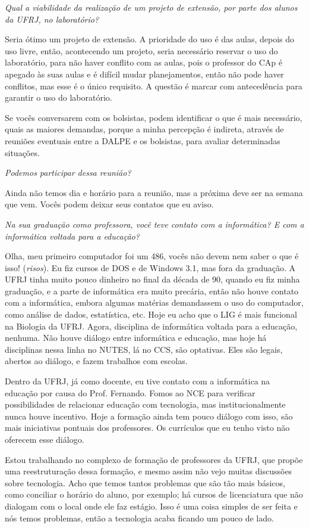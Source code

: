 \textit{Qual a viabilidade da realização de um projeto de extensão, por parte dos alunos da UFRJ, no laboratório?}

Seria ótimo um projeto de extensão. A prioridade do uso é das aulas, depois do uso livre, então, acontecendo um projeto, seria necessário reservar o uso do laboratório, para não haver conflito com as aulas, pois o professor do CAp é apegado às suas aulas e é difícil mudar planejamentos, então não pode haver conflitos, mas esse é o único requisito. A questão é marcar com antecedência para garantir o uso do laboratório.

Se vocês conversarem com os bolsistas, podem identificar o que é mais necessário, quais as maiores demandas, porque a minha percepção é indireta, através de reuniões eventuais entre a DALPE e os bolsistas, para avaliar determinadas situações.

\textit{Podemos participar dessa reunião?}

Ainda não temos dia e horário para a reunião, mas a próxima deve ser na semana que vem. Vocês podem deixar seus contatos que eu aviso.

\textit{Na sua graduação como professora, você teve contato com a informática? E com a informática voltada para a educação?}

Olha, meu primeiro computador foi um 486, vocês não devem nem saber o que é isso! (\textit{risos}). Eu fiz cursos de DOS e de Windows 3.1, mas fora da graduação. A UFRJ tinha muito pouco dinheiro no final da década de 90, quando eu fiz minha graduação, e a parte de informática era muito precária, então não houve contato com a informática, embora algumas matérias demandassem o uso do computador, como análise de dados, estatística, etc. Hoje eu acho que o LIG é mais funcional na Biologia da UFRJ. Agora, disciplina de informática voltada para a educação, nenhuma. Não houve diálogo entre informática e educação, mas hoje há disciplinas nessa linha no NUTES, lá no CCS, são optativas. Eles são legais, abertos ao diálogo, e fazem trabalhos com escolas.

Dentro da UFRJ, já como docente, eu tive contato com a informática na educação por causa do Prof. Fernando. Fomos ao NCE para verificar possibilidades de relacionar educação com tecnologia, mas institucionalmente nunca houve incentivo. Hoje a formação ainda tem pouco diálogo com isso, são mais iniciativas pontuais dos professores. Os currículos que eu tenho visto não oferecem esse diálogo.

Estou trabalhando no complexo de formação de professores da UFRJ, que propõe uma reestruturação dessa formação, e mesmo assim não vejo muitas discussões sobre tecnologia. Acho que temos tantos problemas que são tão mais básicos, como conciliar o horário do aluno, por exemplo; há cursos de licenciatura que não dialogam com o local onde ele faz estágio. Isso é uma coisa simples de ser feita e nós temos problemas, então a tecnologia acaba ficando um pouco de lado.

